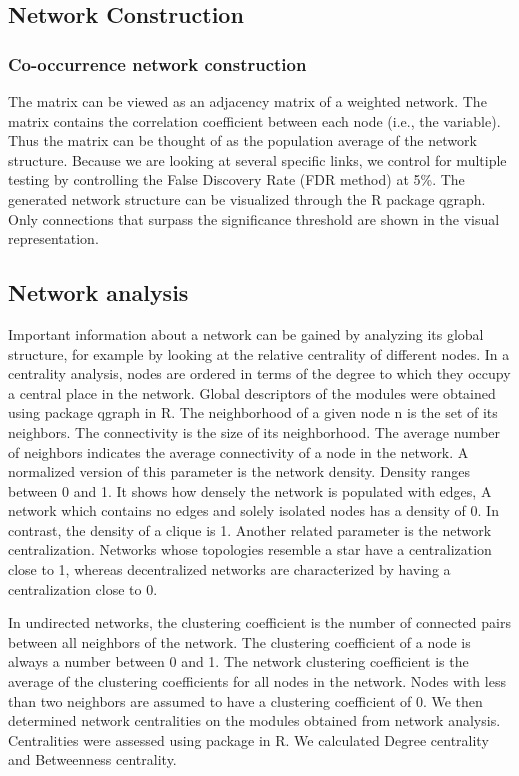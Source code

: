 \documentclass[a4paper]{article}
\begin{document}
\subsection*{Network Construction}
\subsubsection*{Co-occurrence network construction}
The matrix can be viewed as an adjacency matrix of a weighted network. The matrix  contains the correlation coefficient  between each node (i.e., the variable). Thus the matrix  can be thought of as the population average of the network structure. Because we are looking at several specific links, we control for multiple testing by controlling the False Discovery Rate (FDR method) at 5\%. The generated network structure can be visualized through the R package qgraph. Only connections that surpass the significance threshold are shown in the visual representation.

\subsection*{Network analysis}
Important information about a network can be gained by analyzing its global structure, for example by looking at the relative centrality of different nodes. In a centrality analysis, nodes are ordered in terms of the degree to which they occupy a central place in the network. Global descriptors of the modules were obtained using package qgraph in R. The neighborhood of a given node n is the set of its neighbors. The connectivity is the size of its neighborhood. The average number of neighbors indicates the average connectivity of a node in the network. A normalized version of this parameter is the network density. Density ranges between 0 and 1. It shows how densely the network is populated with edges, A network which contains no edges and solely isolated nodes has a density of 0. In contrast, the density of a clique is 1. Another related parameter is the network centralization. Networks whose topologies resemble a star have a centralization close to 1, whereas decentralized networks are characterized by having a centralization close to 0.

In undirected networks, the clustering coefficient is the number of connected pairs between all neighbors of the network. The clustering coefficient of a node is always a number between 0 and 1. The network clustering coefficient is the average of the clustering coefficients for all nodes in the network. Nodes with less than two neighbors are assumed to have a clustering coefficient of 0. We then determined network centralities on the modules obtained from network analysis. Centralities were assessed using package in R. We calculated Degree centrality and Betweenness centrality.
\end{document}
